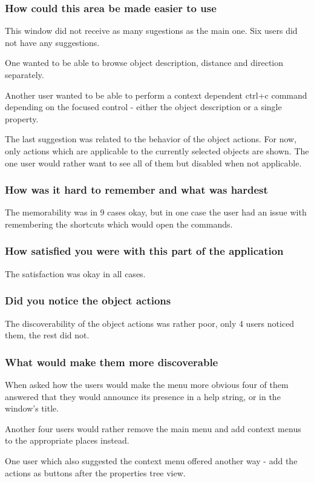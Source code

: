 \documentclass[nolof,digital]{fithesis3}
\begin{document}
\subsubsection{How could this area be made easier to use}
This window did not receive as many sugestions as the main one. Six users did not have any suggestions.

One wanted to be able to browse object description, distance and direction separately.

Another user wanted to be able to perform a context dependent ctrl+c command depending on the focused control - either the object description or a single property.

The last suggestion was related to the behavior of the object actions. For now, only actions which are applicable to the currently selected objects are shown. The one user would rather want to see all of them but disabled when not applicable.
\subsubsection{How was it hard to remember and what was hardest}
The memorability was in 9 cases okay, but in one case the user had an issue with remembering the shortcuts which would open the commands.
\subsubsection{How satisfied you were with this part of the application}
The satisfaction was okay in all cases.
\subsubsection{Did you notice the object actions}
The discoverability of the object actions was rather poor, only 4 users noticed them, the rest did not.
\subsubsection{What would make them more discoverable}
When asked how the users would make the menu more obvious four of them answered that they would announce its presence in a help string, or in the window's title.

Another four users would rather remove the main menu and add context menus to the appropriate places instead.

One user which also suggested the context menu offered another way - add the actions as buttons after the properties tree view.
\end{document}
